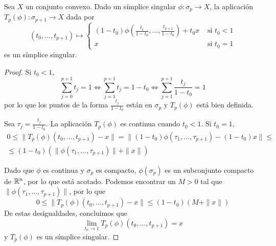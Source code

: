 \begin{lemma}
	Sea $X$ un conjunto convexo.
	Dado un símplice singular $\phi\colon \sigma_{p} \to X$, la aplicación $T_p(\phi)\colon \sigma_{p+1} \to X$ dada por
	\[(t_0,\dots,t_{p+1})\mapsto
		\begin{cases}
		\displaystyle(1-t_0)
		\phi\left(\frac{t_1}{1-t_0},\dots,\frac{t_{p+1}}{1-t_0}\right)+t_0x
		&\mbox{ si }t_0 < 1\\
		x & \mbox{ si }t_0=1
		\end{cases}
	\]
	es un símplice singular.
\end{lemma}

\begin{proof}
	Si $t_0 < 1$,
	\begin{equation}\label{BienDef}
		\sum^{p+1}_{j=0}t_j=
		1 \iff \sum^{p+1}_{j=1}t_j=
		1-t_0 \iff \sum^{p+1}_{j=1}\frac{t_j}{1-t_0}=1
	\end{equation}
	por lo que los puntos de la forma $\frac{t_j}{1-t_0}$ están en $\sigma_p$ y $T_p(\phi)$ está bien definida.

	Sea $\tau_j=\frac{t_j}{1-t_0}$.
	La aplicación $T_p(\phi)$ es continua cuando $t_0 < 1$.
	Si $t_0=1$,
	\begin{multline*}
		0	\leq \|T_p(\phi)(t_0,\dots,t_{p+1})-x\|=\|(1-t_0)\phi(\tau_1,\dots,\tau_{p+1})-(1-t_0)x\|\leq\\
			\leq (1-t_0)(\|\phi(\tau_1,\dots,\tau_{p+1})\|+\|x\|)
	\end{multline*}

	Dado que $\phi$ es continua y $\sigma_p$ es compacto, $\phi(\sigma_p)$ es un subconjunto compacto de $\mathbb{R}^n$, por lo que está acotado.
	Podemos encontrar un $M > 0$ tal que $\|\phi(\tau_1,\dots,\tau_{p+1})\|$, por lo que
		\[0 \leq \|T_p(\phi)(t_0,\dots,t_{p+1})-x\| \leq (1-t_0)(M+\|x\|)\]
	De estas desigualdades, concluimos que
		\[\lim_{t_0 \to 1}T_p(\phi)(t_0,\dots,t_{p+1})=x\]
	y $T_p(\phi)$ es un símplice singular.
\end{proof}

